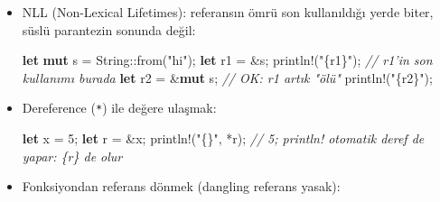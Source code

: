 \documentclass[12pt,a4paper]{article}
\newenvironment{Shaded}{}{}
\newcommand{\CommentTok}[1]{\textcolor[rgb]{0.38,0.63,0.69}{\textit{#1}}}
\newcommand{\DataTypeTok}[1]{\textcolor[rgb]{0.56,0.13,0.00}{#1}}
\newcommand{\DecValTok}[1]{\textcolor[rgb]{0.25,0.63,0.44}{#1}}
\newcommand{\FunctionTok}[1]{\textcolor[rgb]{0.02,0.16,0.49}{#1}}
\newcommand{\KeywordTok}[1]{\textcolor[rgb]{0.00,0.44,0.13}{\textbf{#1}}}
\newcommand{\NormalTok}[1]{#1}
\newcommand{\OperatorTok}[1]{\textcolor[rgb]{0.40,0.40,0.40}{#1}}
\newcommand{\StringTok}[1]{\textcolor[rgb]{0.25,0.44,0.63}{#1}}
\begin{document}
\begin{itemize}
\begin{Shaded}
\begin{Highlighting}[]
\KeywordTok{let} \KeywordTok{mut}\NormalTok{ s }\OperatorTok{=} \DataTypeTok{String}\OperatorTok{::}\FunctionTok{from}\OperatorTok{(}\StringTok{"hi"}\OperatorTok{);}
\KeywordTok{let}\NormalTok{ r1 }\OperatorTok{=} \OperatorTok{\&}\NormalTok{s}\OperatorTok{;}
\KeywordTok{let}\NormalTok{ r2 }\OperatorTok{=} \OperatorTok{\&}\KeywordTok{mut}\NormalTok{ s}\OperatorTok{;}      \CommentTok{// immutable varken mutable istedi}
\NormalTok{println}\OperatorTok{!(}\StringTok{"\{r1\}"}\OperatorTok{);}
\end{Highlighting}
\end{Shaded}


  Hata: \texttt{E0502}: cannot borrow \texttt{s} as mutable because it is also borrowed as immutable
\item
  NLL (Non-Lexical Lifetimes): referansın ömrü son kullanıldığı yerde biter, süslü parantezin sonunda değil:

\begin{Shaded}
\begin{Highlighting}[]
\KeywordTok{let} \KeywordTok{mut}\NormalTok{ s }\OperatorTok{=} \DataTypeTok{String}\OperatorTok{::}\FunctionTok{from}\OperatorTok{(}\StringTok{"hi"}\OperatorTok{);}
\KeywordTok{let}\NormalTok{ r1 }\OperatorTok{=} \OperatorTok{\&}\NormalTok{s}\OperatorTok{;}
\NormalTok{println}\OperatorTok{!(}\StringTok{"\{r1\}"}\OperatorTok{);}          \CommentTok{// r1'in son kullanımı burada}
\KeywordTok{let}\NormalTok{ r2 }\OperatorTok{=} \OperatorTok{\&}\KeywordTok{mut}\NormalTok{ s}\OperatorTok{;}           \CommentTok{// OK: r1 artık "ölü"}
\NormalTok{println}\OperatorTok{!(}\StringTok{"\{r2\}"}\OperatorTok{);}
\end{Highlighting}
\end{Shaded}
\item
  Dereference (\texttt{*}) ile değere ulaşmak:

\begin{Shaded}
\begin{Highlighting}[]
\KeywordTok{let}\NormalTok{ x }\OperatorTok{=} \DecValTok{5}\OperatorTok{;}
\KeywordTok{let}\NormalTok{ r }\OperatorTok{=} \OperatorTok{\&}\NormalTok{x}\OperatorTok{;}
\NormalTok{println}\OperatorTok{!(}\StringTok{"\{\}"}\OperatorTok{,} \OperatorTok{*}\NormalTok{r}\OperatorTok{);}        \CommentTok{// 5; println! otomatik deref de yapar: \{r\} de olur}
\end{Highlighting}
\end{Shaded}
\item
  Fonksiyondan referans dönmek (dangling referans yasak):


\end{itemize}
\end{document}
